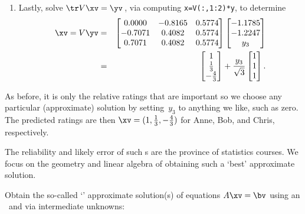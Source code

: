 \begin{example}
\begin{enumerate}
\item Lastly, solve \(\tr V\xv=\yv\)\,, via computing \verb|x=V(:,1:2)*y|, to determine
\begin{eqnarray*}
\xv=V\yv&=&
\begin{bmatrix} 0.0000 & -0.8165 & 0.5774
\\ -0.7071 & 0.4082 & 0.5774
\\  0.7071 & 0.4082 & 0.5774
 \end{bmatrix}\begin{bmatrix} -1.1785\\-1.2247\\y_3 \end{bmatrix}
\\&=&\begin{bmatrix} 1\\\frac13\\-\frac43 \end{bmatrix}
+\frac{y_3}{\sqrt3}\begin{bmatrix} 1\\1\\1 \end{bmatrix}.
\end{eqnarray*}
\end{enumerate}
As before, it is only the relative ratings that are important so we  choose any particular (approximate) solution by setting~\(y_3\) to anything we like, such as zero.
The predicted ratings are then \(\xv=(1,\frac13,-\frac43)\) for Anne, Bob, and Chris, respectively.
\end{example}

The reliability and likely error of such s are the province of statistics courses.
We focus on the geometry and linear algebra of obtaining such a `best' approximate solution.



\begin{procedure}\label{pro:appsol}
    Obtain the so-called `' approximate solution(s) of  equations $A\xv=\bv$ using an \svd\ and via intermediate unknowns:
\end{procedure}





